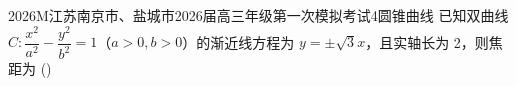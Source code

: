 
\begin{problem}{2026}{M}{江苏南京市、盐城市2026届高三年级第一次模拟考试}{4}{圆锥曲线}
已知双曲线 $C:\dfrac{x^2}{a^2}-\dfrac{y^2}{b^2}=1$（$a>0,b>0$）的渐近线方程为 $y=\pm\sqrt{3}x$，且实轴长为 2，则焦距为
(\hspace{1cm})
\begin{choices}
\end{choices}
\end{problem}